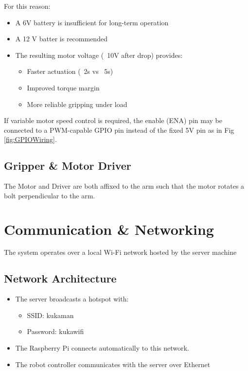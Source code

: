 \documentclass{ol-softwaremanual}
\begin{document}
For this reason:
\begin{itemize}
    \item A 6V battery is insufficient for long-term operation
    \item A 12 V batter is recommended
    \item The resulting motor voltage (~10V after drop) provides:
    \begin{itemize}
        \item Faster actuation (~2s vs ~5s)
        \item Improved torque margin
        \item More reliable gripping under load
    \end{itemize}
\end{itemize}
If variable motor speed control is required, the enable (ENA) pin may be connected to a PWM-capable GPIO pin instead of the fixed 5V pin as in Fig \ref{fig:GPIOWiring}.

\subsection{Gripper \& Motor Driver}

The Motor and Driver are both affixed to the arm such that the motor rotates a bolt perpendicular to the arm. 

\section{Communication \& Networking}

The system operates over a local Wi-Fi network hosted by the server machine

\subsection{Network Architecture}

\begin{itemize}
    \item The server broadcasts a hotspot with:
    \begin{itemize}
        \item SSID: kukaman
        \item Password: kukawifi
    \end{itemize}
    \item The Raspberry Pi connects automatically to this network.
    \item The robot controller communicates with the server over Ethernet
\end{itemize}
\end{document}
